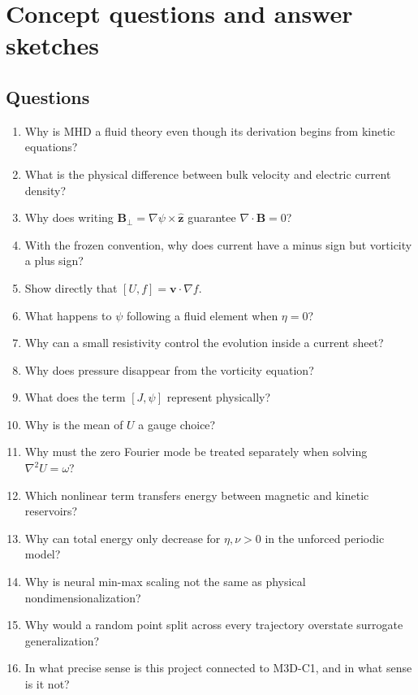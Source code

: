 \documentclass[11pt]{article}
\newcommand{\vect}[1]{\bm{#1}}
\begin{document}
\section{Concept questions and answer sketches}
\label{app:questions}

\subsection*{Questions}

\begin{enumerate}[label=\textbf{Q\arabic*.}]
  \item Why is MHD a fluid theory even though its derivation begins from kinetic equations?
  \item What is the physical difference between bulk velocity and electric current density?
  \item Why does writing $\vect{B}_\perp=\nabla\psi\times\widehat{\vect{z}}$ guarantee $\nabla\cdot\vect{B}=0$?
  \item With the frozen convention, why does current have a minus sign but vorticity a plus sign?
  \item Show directly that $[U,f]=\vect{v}\cdot\nabla f$.
  \item What happens to $\psi$ following a fluid element when $\eta=0$?
  \item Why can a small resistivity control the evolution inside a current sheet?
  \item Why does pressure disappear from the vorticity equation?
  \item What does the term $[J,\psi]$ represent physically?
  \item Why is the mean of $U$ a gauge choice?
  \item Why must the zero Fourier mode be treated separately when solving $\nabla^2U=\omega$?
  \item Which nonlinear term transfers energy between magnetic and kinetic reservoirs?
  \item Why can total energy only decrease for $\eta,\nu>0$ in the unforced periodic model?
  \item Why is neural min-max scaling not the same as physical nondimensionalization?
  \item Why would a random point split across every trajectory overstate surrogate generalization?
  \item In what precise sense is this project connected to M3D-C1, and in what sense is it not?
\end{enumerate}
\end{document}
